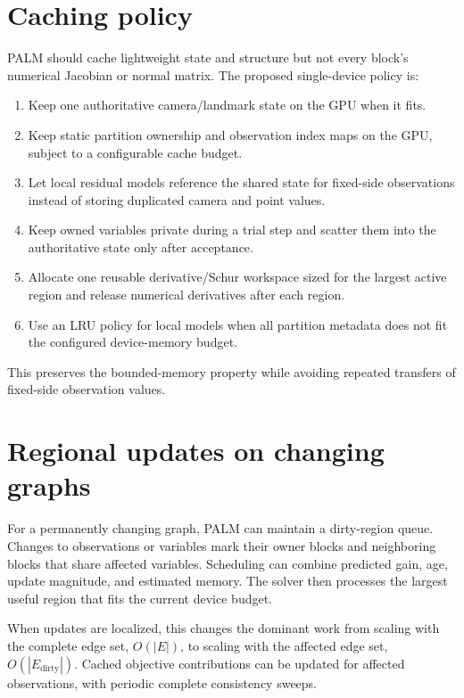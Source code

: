 \documentclass[11pt]{article}
\begin{document}
\section{Caching policy}

PALM should cache lightweight state and structure but not every block's
numerical Jacobian or normal matrix.  The proposed single-device policy is:
\begin{enumerate}
  \item Keep one authoritative camera/landmark state on the GPU when it fits.
  \item Keep static partition ownership and observation index maps on the GPU,
        subject to a configurable cache budget.
  \item Let local residual models reference the shared state for fixed-side
        observations instead of storing duplicated camera and point values.
  \item Keep owned variables private during a trial step and scatter them into
        the authoritative state only after acceptance.
  \item Allocate one reusable derivative/Schur workspace sized for the largest
        active region and release numerical derivatives after each region.
  \item Use an LRU policy for local models when all partition metadata does not
        fit the configured device-memory budget.
\end{enumerate}
This preserves the bounded-memory property while avoiding repeated transfers
of fixed-side observation values.

\section{Regional updates on changing graphs}

For a permanently changing graph, PALM can maintain a dirty-region queue.
Changes to observations or variables mark their owner blocks and neighboring
blocks that share affected variables.  Scheduling can combine predicted gain,
age, update magnitude, and estimated memory.  The solver then processes the
largest useful region that fits the current device budget.

When updates are localized, this changes the dominant work from scaling with
the complete edge set, $O(|E|)$, to scaling with the affected edge set,
$O(|E_{\mathrm{dirty}}|)$.  Cached objective contributions can be updated for
affected observations, with periodic complete consistency sweeps.
\end{document}
